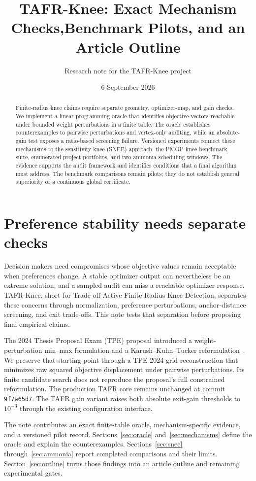 \documentclass[11pt]{article}
\title{TAFR-Knee: Exact Mechanism Checks,\newline Benchmark Pilots, and an Article Outline}
\author{Research note for the TAFR-Knee project}\date{6 September 2026}
\begin{document}
\maketitle
\begin{abstract}
Finite-radius knee claims require separate geometry, optimizer-map, and gain checks.
We implement a linear-programming oracle that identifies objective vectors reachable under bounded weight perturbations in a finite table.
The oracle establishes counterexamples to pairwise perturbations and vertex-only auditing, while an absolute-gain test exposes a ratio-based screening failure.
Versioned experiments connect these mechanisms to the sensitivity knee (SNEE) approach, the PMOP knee benchmark suite, enumerated project portfolios, and two ammonia scheduling windows.
The evidence supports the audit framework and identifies conditions that a final algorithm must address.
The benchmark comparisons remain pilots; they do not establish general superiority or a continuous global certificate.
\end{abstract}

\section{Preference stability needs separate checks}
Decision makers need compromises whose objective values remain acceptable when preferences change.
A stable optimizer output can nevertheless be an extreme solution, and a sampled audit can miss a reachable optimizer response.
TAFR-Knee, short for Trade-off-Active Finite-Radius Knee Detection, separates these concerns through normalization, preference perturbations, anchor-distance screening, and exit trade-offs.
This note tests that separation before proposing final empirical claims.

The 2024 Thesis Proposal Exam (TPE) proposal introduced a weight-perturbation min--max formulation and a Karush--Kuhn--Tucker reformulation~\cite{proposal}.
We preserve that starting point through a TPE-2024-grid reconstruction that minimizes raw squared objective displacement under pairwise perturbations.
Its finite candidate search does not reproduce the proposal's full constrained reformulation.
The production TAFR core remains unchanged at commit \texttt{9f7a65d7}.
The TAFR gain variant raises both absolute exit-gain thresholds to $10^{-3}$ through the existing configuration interface.

The note contributes an exact finite-table oracle, mechanism-specific evidence, and a versioned pilot record.
Sections~\ref{sec:oracle} and~\ref{sec:mechanisms} define the oracle and explain the counterexamples.
Sections~\ref{sec:snee} through~\ref{sec:ammonia} report completed comparisons and their limits.
Section~\ref{sec:outline} turns those findings into an article outline and remaining experimental gates.
\end{document}
